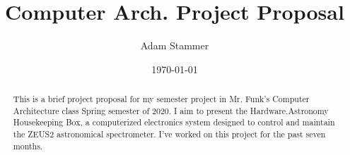 \documentclass[prb,preprint]{revtex4-1}
\begin{document}
\title{Computer Arch. Project Proposal}
\author{Adam Stammer}

\date{\today}

\begin{abstract}
This is a brief project proposal for my semester project in Mr. Funk's Computer Architecture class Spring semester of 2020. I aim to present the Hardware.Astronomy Housekeeping Box, a computerized electronics system designed to control and maintain the ZEUS2 astronomical spectrometer. I've worked on this project for the past seven months.
\end{abstract}

\maketitle


%
%
%
%
%
%
%
%
\end{document}
